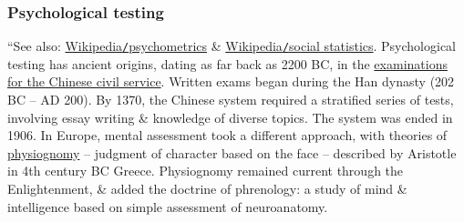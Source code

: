 \documentclass[oneside]{book}
\numberwithin{equation}{section}
\begin{document}
\subsubsection{Psychological testing}
``See also: \href{https://en.wikipedia.org/wiki/Psychometrics}{Wikipedia\texttt{/}psychometrics} \& \href{https://en.wikipedia.org/wiki/Social_statistics}{Wikipedia\texttt{/}social statistics}. Psychological testing has ancient origins, dating as far back as 2200 BC, in the \href{https://en.wikipedia.org/wiki/Imperial_examination}{examinations for the Chinese civil service}. Written exams began during the Han dynasty (202 BC -- AD 200). By 1370, the Chinese system required a stratified series of tests, involving essay writing \& knowledge of diverse topics. The system was ended in 1906. In Europe, mental assessment took a different approach, with theories of \href{https://en.wikipedia.org/wiki/Physiognomy}{physiognomy} -- judgment of character based on the face -- described by Aristotle in 4th century BC Greece. Physiognomy remained current through the Enlightenment, \& added the doctrine of phrenology: a study of mind \& intelligence based on simple assessment of neuroanatomy.
\end{document}
